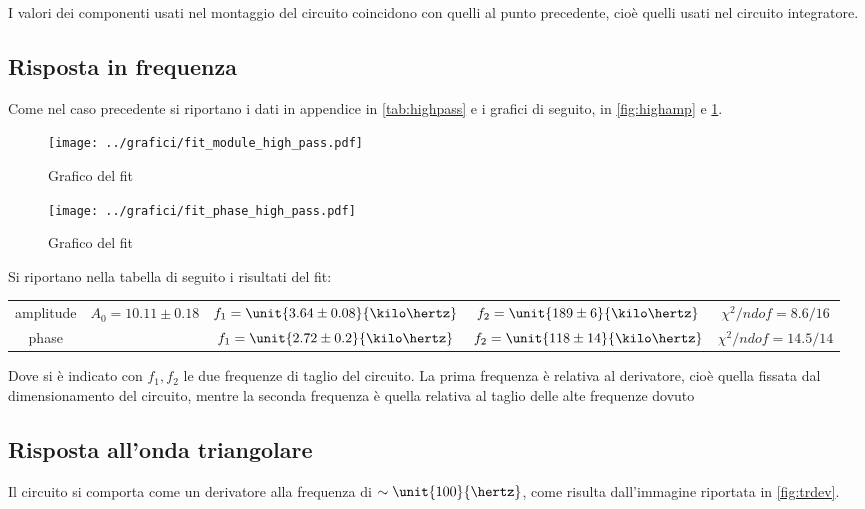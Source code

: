 \documentclass[10pt,a4paper]{article}
\begin{document}
I valori dei componenti usati nel montaggio del circuito coincidono con quelli al punto precedente, cioè quelli usati nel circuito integratore.

\subsection{Risposta in frequenza}

Come nel caso precedente si riportano i dati in appendice in \tablename{\ref{tab:highpass}} e i grafici di seguito, in \figurename{\ref{fig:highamp}} e \figurename{\ref{fig:highph}}.

\begin{figure}[h!]
\centering
	\begin{minipage}[h!]{0.48\textwidth}
		\centering
		\texttt{[image: ../grafici/fit\_module\_high\_pass.pdf]}
		\caption{Grafico del fit }
		\label{fig:highamp}
	\end{minipage}
	\begin{minipage}[h!]{0.48\textwidth}
		\centering
		\texttt{[image: ../grafici/fit\_phase\_high\_pass.pdf]}
		\caption{Grafico del fit }
		\label{fig:highph}
	\end{minipage}
\end{figure}

Si riportano nella tabella di seguito i risultati del fit:

\begin{table}[h!]
\centering
\begin{tabular}{c|cccc}
amplitude	&	$A_0 = 10.11 \pm 0.18$	&	$f_1 = \unit{3.64 \pm 0.08}{\kilo\hertz}$	&	$f_2 = \unit{189 \pm 6}{\kilo\hertz}$	&	$\chi^2/ndof = 8.6 / 16$\\
phase		& &	$f_1 = \unit{2.72 \pm 0.2}{\kilo\hertz}$	&	$f_2 = \unit{118 \pm 14}{\kilo\hertz}$	&	$\chi^2/ndof = 14.5 / 14$
\end{tabular}
\end{table}

\noindent Dove si è indicato con $f_1, f_2$ le due frequenze di taglio del circuito. La prima frequenza è relativa al derivatore, cioè quella fissata dal dimensionamento del circuito, mentre la seconda frequenza è quella relativa al taglio delle alte frequenze dovuto 

\subsection{Risposta all'onda triangolare}
Il circuito si comporta come un derivatore alla frequenza di $\sim \unit{100}{\hertz}$, come risulta dall'immagine riportata in \figurename{\ref{fig:trdev}}.
\end{document}
